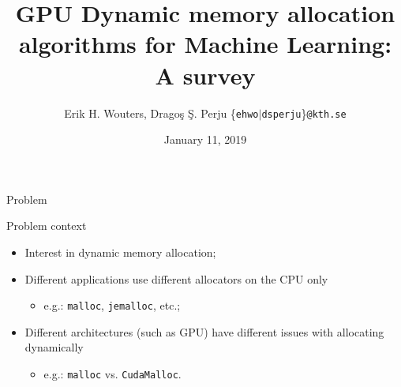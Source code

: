 \documentclass[10pt]{beamer}
\title{GPU Dynamic memory allocation algorithms for Machine Learning: A survey}
\author{Erik H. Wouters, Dragoş Ş. Perju \{\texttt{ehwo}$\mid$\texttt{dsperju}\}\texttt{@kth.se}}
\date{January 11, 2019}
\institute{KTH Royal University of Technology \quad Stockholm, Sweden}
\begin{document}
\maketitle






\begin{frame}[fragile]{Problem}


\begin{exampleblock}{Problem context}
 \begin{itemize}
 \item Interest in dynamic memory allocation;
 \item Different applications use different allocators on the CPU only
     \begin{itemize}
         \item e.g.: \texttt{malloc}, \texttt{jemalloc}, etc.;
     \end{itemize}
 \item Different architectures (such as GPU) have different issues with allocating dynamically
     \begin{itemize}
         \item e.g.: \texttt{malloc} vs. \texttt{CudaMalloc}.
     \end{itemize}
 \end{itemize}
\end{exampleblock}
\end{frame}
\end{document}
